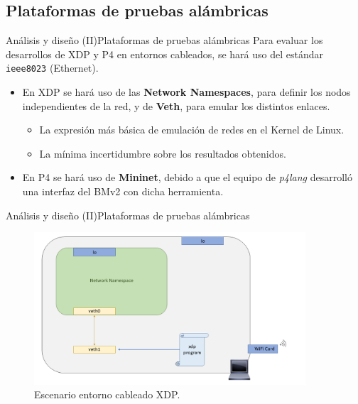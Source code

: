 \documentclass[10pt,compress,xcolor=table]{beamer} %
\begin{document}
\subsection{Plataformas de pruebas alámbricas}
\begin{frame}{Análisis y diseño (II)}{Plataformas de pruebas alámbricas}
Para evaluar los desarrollos de XDP y P4 en entornos cableados, se hará uso del estándar
\texttt{ieee8023} (Ethernet).\vspace{0.2cm}
\begin{itemize}
    \item En XDP se hará uso de las \textbf{Network Namespaces}, para definir los nodos independientes de la red, y de \textbf{Veth}, para emular los distintos enlaces.\vspace{0.2cm}\begin{itemize}
        \item La expresión más básica de emulación de redes en el Kernel de Linux.\vspace{0.2cm}
        
        \item La mínima incertidumbre sobre los resultados obtenidos.

    \end{itemize}\vspace{0.2cm}
    \item En P4 se hará uso de \textbf{Mininet}, debido a que el equipo de \textit{p4lang} desarrolló una interfaz del BMv2 con dicha herramienta.
\end{itemize}
\end{frame}

\begin{frame}{Análisis y diseño (II)}{Plataformas de pruebas alámbricas}
\begin{figure}
  \includegraphics[width=0.9\textwidth]{img/2.png}
  \caption{Escenario entorno cableado XDP.}
  \label{fig:cableados}
\end{figure}
\end{frame}
\end{document}
